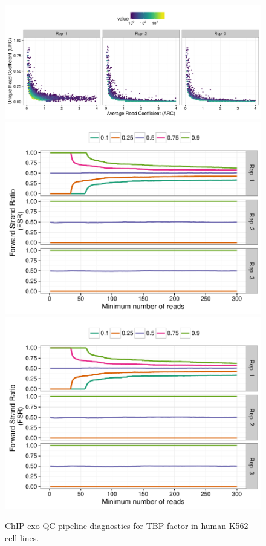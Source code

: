 \documentclass{article}
\begin{document}
\begin{figure}[H]
  \centering
  \includegraphics[width = .75\textwidth,page =
1]{figures/supplement/QC/Venters_K562_TBP_enrichment.pdf}\\
\includegraphics[width = .65\textwidth,page =
1]{figures/supplement/QC/Venters_K562_TBP_strand_imbalance.pdf}
\includegraphics[width = .65\textwidth,page =
3]{figures/supplement/QC/Venters_K562_TBP_strand_imbalance.pdf}
\caption{ChIP-exo QC pipeline diagnostics for TBP factor in human K562
  cell lines.}
  \label{sfig:qc5}
\end{figure}
\end{document}
